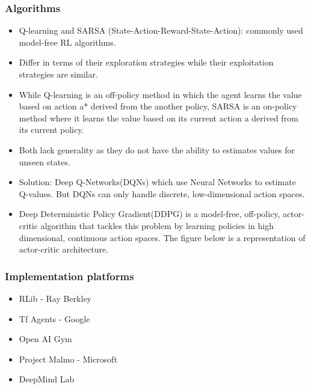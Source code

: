 \begin{frame}[fragile]\frametitle{Algorithms}

\begin{itemize}
\item Q-learning and SARSA (State-Action-Reward-State-Action): commonly used model-free RL algorithms. 
\item Differ in terms of their exploration strategies while their exploitation strategies are similar. 
\item While Q-learning is an off-policy method in which the agent learns the value based on action a* derived from the another policy, SARSA is an on-policy method where it learns the value based on its current action a derived from its current policy.
\item Both lack generality as they do not have the ability to estimates values for unseen states.
\item Solution:  Deep Q-Networks(DQNs) which use Neural Networks to estimate Q-values. But DQNs can only handle discrete, low-dimensional action spaces.
\item Deep Deterministic Policy Gradient(DDPG) is a model-free, off-policy, actor-critic algorithm that tackles this problem by learning policies in high dimensional, continuous action spaces. The figure below is a representation of actor-critic architecture.
\end{itemize}




\end{frame}

\begin{frame}[fragile]\frametitle{Implementation platforms}

\begin{itemize}
\item RLib - Ray Berkley
\item Tf Agents - Google
\item Open AI Gym
\item Project Malmo - Microsoft
\item DeepMind Lab
\end{itemize}

\end{frame}

